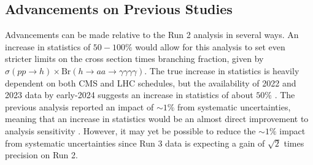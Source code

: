 \documentclass[12pt]{article}
\begin{document}
\subsection{Advancements on Previous Studies}
Advancements can be made relative to the Run 2 analysis in several ways. An increase in statistics of $50-100\%$ would allow for this analysis to set even stricter limits on the cross section times branching fraction, given by $\sigma(pp \rightarrow h) \times \mathrm{Br}(h\rightarrow aa \rightarrow \gamma\gamma\gamma\gamma)$. The true increase in statistics is heavily dependent on both CMS and LHC schedules, but the availability of 2022 and 2023 data by early-2024 suggests an increase in statistics of about $50\%$ \cite{PC_CMS_Week}. The previous analysis reported an impact of ${\sim}1\%$ from systematic uncertainties, meaning that an increase in statistics would be an almost direct improvement to analysis sensitivity \cite{Run2_analysis}. However, it may yet be possible to reduce the ${\sim}1\%$ impact from systematic uncertainties since Run 3 data is expecting a gain of $\sqrt{2}$ times precision on Run 2.\par

\end{document}
